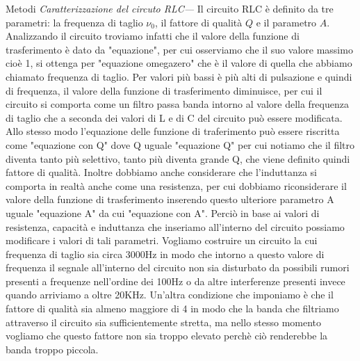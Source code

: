 \documentclass[
    rmp,
    reprint, 
    superscriptaddress, 
    altaffilletter, 
    amsmath, 
    amssymb, 
    a4paper]{revtex4-2}
\begin{document}
\begin{methods}{Metodi}
    \textit{Caratterizzazione del circuto RLC---} Il circuito RLC è definito da tre parametri: la frequenza di taglio $\nu_0$, il fattore di qualità $Q$ e il parametro $A$. Analizzando il circuito troviamo infatti che il valore della funzione di trasferimento è dato da "equazione", per cui osserviamo che il suo valore massimo cioè 1, si ottenga per "equazione omegazero" che è il valore di quella che abbiamo chiamato frequenza di taglio. Per valori più bassi è più alti di pulsazione e quindi di frequenza, il valore della funzione di trasferimento diminuisce, per cui il circuito si comporta come un filtro passa banda intorno al valore della frequenza di taglio che a seconda dei valori di L e di C del circuito può essere modificata. Allo stesso modo l'equazione delle funzione di traferimento può essere riscritta come "equazione con Q" dove Q uguale "equazione Q" per cui notiamo che il filtro diventa tanto più selettivo, tanto più diventa grande Q, che viene definito quindi fattore di qualità. Inoltre dobbiamo anche considerare che l'induttanza si comporta in realtà anche come una resistenza, per cui dobbiamo riconsiderare il valore della funzione di trasferimento inserendo questo ulteriore parametro A uguale "equazione A" da cui "equazione con A". 
    Perciò in base ai valori di resistenza, capacità e induttanza che inseriamo all'interno del circuito possiamo modificare i valori di tali parametri. Vogliamo costruire un circuito la cui frequenza di taglio sia circa 3000Hz in modo che intorno a questo valore di frequenza il segnale all'interno del circuito non sia disturbato da possibili rumori presenti a frequenze nell'ordine dei 100Hz o da altre interferenze presenti invece quando arriviamo a oltre 20KHz. Un'altra condizione che imponiamo è che il fattore di qualità sia almeno maggiore di 4 in modo che la banda che filtriamo attraverso il circuito sia sufficientemente stretta, ma nello stesso momento vogliamo che questo fattore non sia troppo elevato perchè ciò renderebbe la banda troppo piccola.
    

\end{methods}
\end{document}
